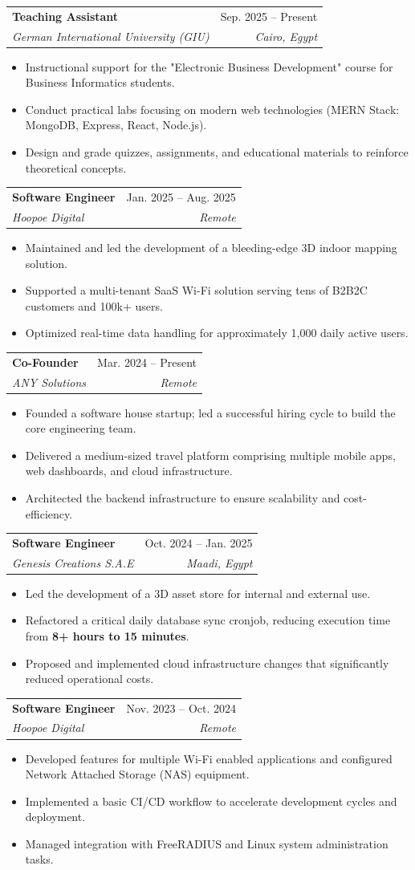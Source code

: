\documentclass[letterpaper,11pt]{article}
\makeatletter
\newcommand{\resumeItem}[1]{
  \item\small{
    {#1 \vspace{-2pt}}
  }
}
\newcommand{\resumeSubheading}[4]{
  \vspace{-2pt}\item
    \begin{tabular*}{0.97\textwidth}[t]{l@{\extracolsep{\fill}}r}
      \textbf{#1} & #2 \\
      \textit{\small#3} & \textit{\small #4} \\
    \end{tabular*}\vspace{-7pt}
}
\newcommand{\resumeItemListStart}{\begin{itemize}}
\newcommand{\resumeItemListEnd}{\end{itemize}\vspace{-5pt}}
\makeatother
\begin{document}
    \resumeSubheading
      {Teaching Assistant}{Sep. 2025 -- Present}
      {German International University (GIU)}{Cairo, Egypt}
      \resumeItemListStart
        \resumeItem{Instructional support for the "Electronic Business Development" course for Business Informatics students.}
        \resumeItem{Conduct practical labs focusing on modern web technologies (MERN Stack: MongoDB, Express, React, Node.js).}
        \resumeItem{Design and grade quizzes, assignments, and educational materials to reinforce theoretical concepts.}
      \resumeItemListEnd

    \resumeSubheading
      {Software Engineer}{Jan. 2025 -- Aug. 2025}
      {Hoopoe Digital}{Remote}
      \resumeItemListStart
        \resumeItem{Maintained and led the development of a bleeding-edge 3D indoor mapping solution.}
        \resumeItem{Supported a multi-tenant SaaS Wi-Fi solution serving tens of B2B2C customers and 100k+ users.}
        \resumeItem{Optimized real-time data handling for approximately 1,000 daily active users.}
      \resumeItemListEnd

    \resumeSubheading
      {Co-Founder}{Mar. 2024 -- Present}
      {ANY Solutions}{Remote}
      \resumeItemListStart
        \resumeItem{Founded a software house startup; led a successful hiring cycle to build the core engineering team.}
        \resumeItem{Delivered a medium-sized travel platform comprising multiple mobile apps, web dashboards, and cloud infrastructure.}
        \resumeItem{Architected the backend infrastructure to ensure scalability and cost-efficiency.}
      \resumeItemListEnd

    \resumeSubheading
      {Software Engineer}{Oct. 2024 -- Jan. 2025}
      {Genesis Creations S.A.E}{Maadi, Egypt}
      \resumeItemListStart
        \resumeItem{Led the development of a 3D asset store for internal and external use.}
        \resumeItem{Refactored a critical daily database sync cronjob, reducing execution time from \textbf{8+ hours to 15 minutes}.}
        \resumeItem{Proposed and implemented cloud infrastructure changes that significantly reduced operational costs.}
      \resumeItemListEnd

    \resumeSubheading
      {Software Engineer}{Nov. 2023 -- Oct. 2024}
      {Hoopoe Digital}{Remote}
      \resumeItemListStart
        \resumeItem{Developed features for multiple Wi-Fi enabled applications and configured Network Attached Storage (NAS) equipment.}
        \resumeItem{Implemented a basic CI/CD workflow to accelerate development cycles and deployment.}
        \resumeItem{Managed integration with FreeRADIUS and Linux system administration tasks.}
      \resumeItemListEnd
\end{document}
